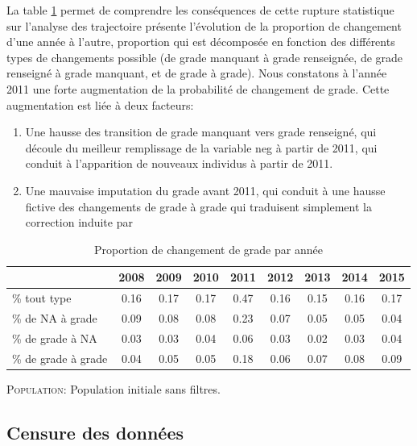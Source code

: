 \documentclass[11pt,a4paper]{article}
\begin{document}
La table \ref{quality2} permet de comprendre les conséquences de cette rupture statistique sur l'analyse des trajectoire présente l'évolution de la proportion de changement d'une année à l'autre, proportion qui est décomposée en fonction des différents types de changements possible (de grade manquant à grade renseignée, de grade renseigné à grade manquant, et de grade à grade). 
Nous constatons à l'année 2011 une forte augmentation de la probabilité de changement de grade. Cette augmentation est liée à deux facteurs: 
\begin{enumerate}
\item Une hausse des transition de grade manquant vers grade renseigné, qui découle du meilleur remplissage de la variable neg à partir de 2011, qui conduit à l'apparition de nouveaux individus à partir de 2011.  
\item Une mauvaise imputation du grade avant 2011, qui conduit à une hausse fictive des changements de grade à grade qui traduisent simplement la correction induite par 
\end{enumerate}
 

\begin{table}[h!]
\centering
\caption{Proportion de changement de grade par année} 
\label{quality2}
\begin{tabular}{lcccccccc}
\toprule
 & 2008 & 2009 & 2010 & 2011 & 2012 & 2013 & 2014 & 2015 \\ 
  \hline
\% tout type & 0.16 & 0.17 & 0.17 & 0.47 & 0.16 & 0.15 & 0.16 & 0.17 \\ 
\midrule
  \% de NA à grade & 0.09 & 0.08 & 0.08 & 0.23 & 0.07 & 0.05 & 0.05 & 0.04 \\ 
  \% de grade à NA & 0.03 & 0.03 & 0.04 & 0.06 & 0.03 & 0.02 & 0.03 & 0.04 \\ 
  \% de grade à grade & 0.04 & 0.05 & 0.05 & 0.18 & 0.06 & 0.07 & 0.08 & 0.09 \\ 
\bottomrule
\end{tabular}
\begin{minipage}{12cm}
\footnotesize
\textsc{Population:} Population initiale sans filtres.
\end{minipage}
\end{table}







\subsection{Censure des données}
\end{document}
